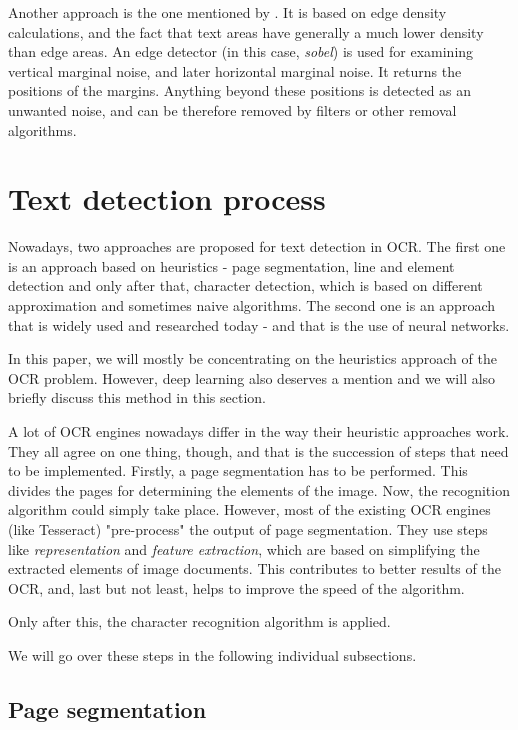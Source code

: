 Another approach is the one mentioned by \citet{marginalNoiseEdge}. It is based on edge density calculations, and the fact that text areas have generally a much lower density than edge areas. An edge detector (in this case, \emph{sobel}) is used for examining vertical marginal noise, and later horizontal marginal noise. It returns the positions of the margins. Anything beyond these positions is detected as an unwanted noise, and can be therefore removed by filters or other removal algorithms.

\section{Text detection process}

Nowadays, two approaches are proposed for text detection in OCR. The first one is an approach based on heuristics - page segmentation, line and element detection and only after that, character detection, which is based on different approximation and sometimes naive algorithms. The second one is an approach that is widely used and researched today - and that is the use of neural networks.

In this paper, we will mostly be concentrating on the heuristics approach of the OCR problem. However, deep learning also deserves a mention and we will also briefly discuss this method in this section.

A lot of OCR engines nowadays differ in the way their heuristic approaches work. They all agree on one thing, though, and that is the succession of steps that need to be implemented. Firstly, a page segmentation has to be performed. This divides the pages for determining the elements of the image. Now, the recognition algorithm could simply take place. However, most of the existing OCR engines (like Tesseract) "pre-process" the output of page segmentation. They use steps like \emph{representation} and \emph{feature extraction}, which are based on simplifying the extracted elements of image documents. This contributes to better results of the OCR, and, last but not least, helps to improve the speed of the algorithm.

Only after this, the character recognition algorithm is applied.

We will go over these steps in the following individual subsections.

\subsection{Page segmentation}

